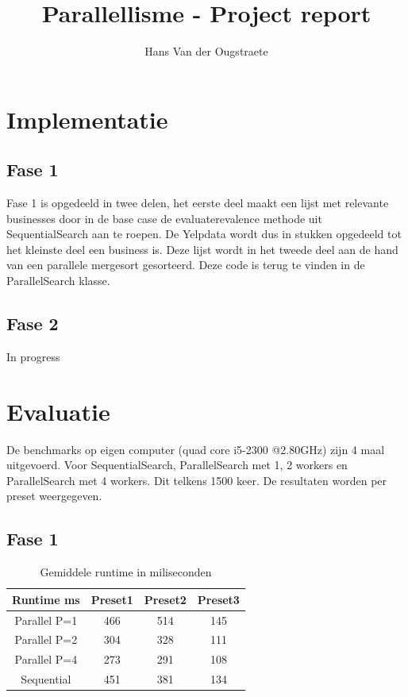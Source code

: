 \documentclass[]{article}
\title{Parallellisme - Project report}
\author{Hans Van der Ougstraete}
\begin{document}
\maketitle
\clearpage
\tableofcontents
\clearpage

\section{Implementatie}

\subsection{Fase 1}
Fase 1 is opgedeeld in twee delen, het eerste deel maakt een lijst met relevante businesses door in de base case de evaluaterevalence methode uit SequentialSearch aan te roepen. De Yelpdata wordt dus in stukken opgedeeld tot het kleinste deel een business is. Deze lijst wordt in het tweede deel aan de hand van een parallele mergesort gesorteerd. Deze code is terug te vinden in de ParallelSearch klasse.
\subsection{Fase 2}
In progress
\section{Evaluatie}
De benchmarks op eigen computer (quad core i5-2300 @2.80GHz) zijn 4 maal uitgevoerd. Voor SequentialSearch, ParallelSearch met 1, 2 workers en ParallelSearch met 4 workers. Dit telkens 1500 keer. De resultaten worden per preset weergegeven.

\subsection{Fase 1}

\begin{table}[h!]
	\centering
\begin{tabular}{|c|c|c|c|}
	\hline 
	Runtime ms & Preset1 & Preset2 & Preset3 \\ 
	\hline 
	Parallel P=1 & 466 & 514 & 145 \\ 
	\hline 
	Parallel P=2 & 304 & 328 & 111 \\ 
	\hline 
	Parallel P=4 & 273 & 291 & 108 \\ 
	\hline 
	Sequential & 451 & 381 & 134 \\ 
	\hline 
\end{tabular}
\caption{Gemiddele runtime in miliseconden}
\label{table:1}
\end{table}
\end{document}
